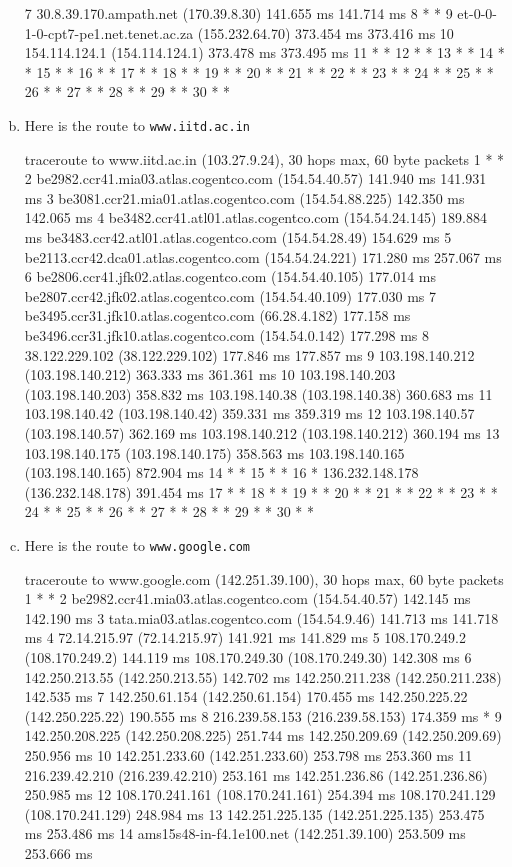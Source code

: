 \documentclass{article}
\begin{document}
\begin{enumerate}[a.]
\begin{code}
 7  30.8.39.170.ampath.net (170.39.8.30)  141.655 ms  141.714 ms
 8  * *
 9  et-0-0-1-0-cpt7-pe1.net.tenet.ac.za (155.232.64.70)  373.454 ms  373.416 ms
10  154.114.124.1 (154.114.124.1)  373.478 ms  373.495 ms
11  * *
12  * *
13  * *
14  * *
15  * *
16  * *
17  * *
18  * *
19  * *
20  * *
21  * *
22  * *
23  * *
24  * *
25  * *
26  * *
27  * *
28  * *
29  * *
30  * *
\end{code}
\item Here is the route to {\tt www.iitd.ac.in}
\begin{code}
traceroute to www.iitd.ac.in (103.27.9.24), 30 hops max, 60 byte packets
 1  * *
 2  be2982.ccr41.mia03.atlas.cogentco.com (154.54.40.57)  141.940 ms  141.931 ms
 3  be3081.ccr21.mia01.atlas.cogentco.com (154.54.88.225)  142.350 ms  142.065 ms
 4  be3482.ccr41.atl01.atlas.cogentco.com (154.54.24.145)  189.884 ms be3483.ccr42.atl01.atlas.cogentco.com (154.54.28.49)  154.629 ms
 5  be2113.ccr42.dca01.atlas.cogentco.com (154.54.24.221)  171.280 ms  257.067 ms
 6  be2806.ccr41.jfk02.atlas.cogentco.com (154.54.40.105)  177.014 ms be2807.ccr42.jfk02.atlas.cogentco.com (154.54.40.109)  177.030 ms
 7  be3495.ccr31.jfk10.atlas.cogentco.com (66.28.4.182)  177.158 ms be3496.ccr31.jfk10.atlas.cogentco.com (154.54.0.142)  177.298 ms
 8  38.122.229.102 (38.122.229.102)  177.846 ms  177.857 ms
 9  103.198.140.212 (103.198.140.212)  363.333 ms  361.361 ms
10  103.198.140.203 (103.198.140.203)  358.832 ms 103.198.140.38 (103.198.140.38)  360.683 ms
11  103.198.140.42 (103.198.140.42)  359.331 ms  359.319 ms
12  103.198.140.57 (103.198.140.57)  362.169 ms 103.198.140.212 (103.198.140.212)  360.194 ms
13  103.198.140.175 (103.198.140.175)  358.563 ms 103.198.140.165 (103.198.140.165)  872.904 ms
14  * *
15  * *
16  * 136.232.148.178 (136.232.148.178)  391.454 ms
17  * *
18  * *
19  * *
20  * *
21  * *
22  * *
23  * *
24  * *
25  * *
26  * *
27  * *
28  * *
29  * *
30  * *
\end{code}
\item Here is the route to {\tt www.google.com}
\begin{code}
traceroute to www.google.com (142.251.39.100), 30 hops max, 60 byte packets
 1  * *
 2  be2982.ccr41.mia03.atlas.cogentco.com (154.54.40.57)  142.145 ms  142.190 ms
 3  tata.mia03.atlas.cogentco.com (154.54.9.46)  141.713 ms  141.718 ms
 4  72.14.215.97 (72.14.215.97)  141.921 ms  141.829 ms
 5  108.170.249.2 (108.170.249.2)  144.119 ms 108.170.249.30 (108.170.249.30)  142.308 ms
 6  142.250.213.55 (142.250.213.55)  142.702 ms 142.250.211.238 (142.250.211.238)  142.535 ms
 7  142.250.61.154 (142.250.61.154)  170.455 ms 142.250.225.22 (142.250.225.22)  190.555 ms
 8  216.239.58.153 (216.239.58.153)  174.359 ms *
 9  142.250.208.225 (142.250.208.225)  251.744 ms 142.250.209.69 (142.250.209.69)  250.956 ms
10  142.251.233.60 (142.251.233.60)  253.798 ms  253.360 ms
11  216.239.42.210 (216.239.42.210)  253.161 ms 142.251.236.86 (142.251.236.86)  250.985 ms
12  108.170.241.161 (108.170.241.161)  254.394 ms 108.170.241.129 (108.170.241.129)  248.984 ms
13  142.251.225.135 (142.251.225.135)  253.475 ms  253.486 ms
14  ams15s48-in-f4.1e100.net (142.251.39.100)  253.509 ms  253.666 ms
\end{code}


\end{enumerate}
\end{document}
